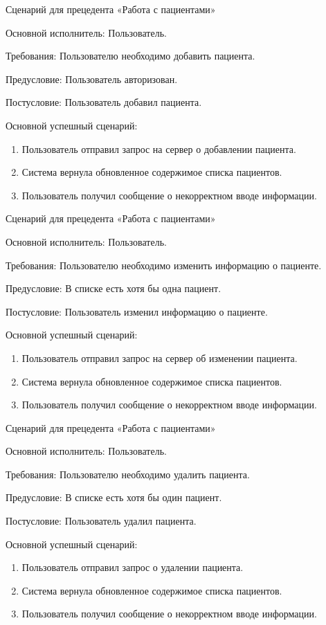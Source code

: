 Сценарий для прецедента «Работа с пациентами»

Основной исполнитель: Пользователь.

Требования: Пользователю необходимо добавить пациента.

Предусловие: Пользователь авторизован.

Постусловие: Пользователь добавил пациента.

Основной успешный сценарий:
\begin{enumerate}
	\item Пользователь отправил запрос на сервер о добавлении пациента.
	\item Система вернула обновленное содержимое списка пациентов.
	\item Пользователь получил сообщение о некорректном вводе информации.\\
\end{enumerate}

Сценарий для прецедента «Работа с пациентами»

Основной исполнитель: Пользователь.

Требования: Пользователю необходимо изменить информацию о пациенте.

Предусловие: В списке есть хотя бы одна пациент.

Постусловие: Пользователь изменил информацию о пациенте.

Основной успешный сценарий:
\begin{enumerate}
	\item Пользователь отправил запрос на сервер об изменении пациента.
	\item Система вернула обновленное содержимое списка пациентов.
	\item Пользователь получил сообщение о некорректном вводе информации.\\
\end{enumerate} 

Сценарий для прецедента «Работа с пациентами»

Основной исполнитель: Пользователь.

Требования: Пользователю необходимо удалить пациента.

Предусловие: В списке есть хотя бы один пациент.

Постусловие: Пользователь удалил пациента.

Основной успешный сценарий:
\begin{enumerate}
	\item Пользователь отправил запрос о удалении пациента.
	\item Система вернула обновленное содержимое списка пациентов.
	\item Пользователь получил сообщение о некорректном вводе информации.
\end{enumerate}

